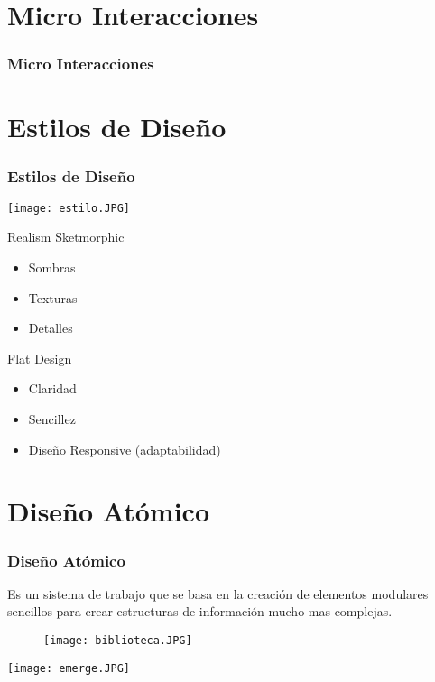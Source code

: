 \documentclass[11pt]{beamer}
\begin{document}
\section{Micro Interacciones}
\begin{frame}
\frametitle{Micro Interacciones}
\newline
\end{frame}

\section{Estilos de Diseño}
\begin{frame}
\frametitle{Estilos de Diseño}
\begin{minipage}[c]{7cm} 
\texttt{[image: estilo.JPG]} 
\end{minipage}
\begin{minipage}[c]{4cm} 
Realism Sketmorphic
\begin{itemize}
\item Sombras
\item Texturas
\item Detalles
\end{itemize}
Flat Design
\begin{itemize}
\item Claridad
\item Sencillez
\item Diseño Responsive (adaptabilidad)
\end{itemize}
\end{minipage} 
\end{frame}

\section{Diseño Atómico}
\begin{frame}
\frametitle{Diseño Atómico}
\begin{minipage}[c]{4cm} 
Es un sistema de trabajo que se basa en la creación de elementos modulares sencillos para crear estructuras de información mucho mas complejas.
\begin{figure}[posición]
  \centering
  \texttt{[image: biblioteca.JPG]} 
\end{figure}
\end{minipage}
\begin{minipage}[c]{7cm} 
\texttt{[image: emerge.JPG]}
\end{minipage} 
\end{frame}
\end{document}
